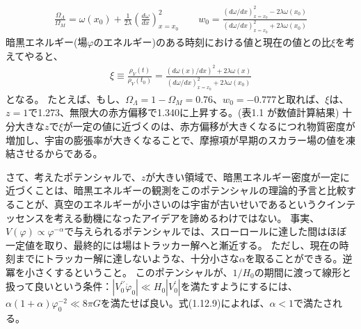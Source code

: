 \documentclass[11pt]{ltjsarticle}
\theoremstyle{plain}
\theoremstyle{break}
\begin{document}
\begin{align}
  \frac{\Omega_{\Lambda}}{\Omega_{M}}=\omega\left(x_{0}\right)+\frac{1}{2 \lambda}\left(\frac{d \omega}{d x}\right)_{x=x_{0}}^{2} \qquad w_{0}=\frac{(d \omega / d x)_{x=x_{0}}^{2}-2 \lambda \omega\left(x_{0}\right)}{(d \omega / d x)_{x=x_{0}}^{2}+2 \lambda \omega\left(x_{0}\right)}
\end{align}%
暗黒エネルギー(場$\varphi$のエネルギー)のある時刻における値と現在の値との比$\xi$を考えてやると、
\begin{align}
  \xi \equiv \frac{\rho_{V}(t)}{\rho_{V}\left(t_{0}\right)}=\frac{(d \omega(x) / d x)^{2}+2 \lambda \omega(x)}{(d \omega / d x)_{x=x_{0}}^{2}+2 \lambda \omega\left(x_{0}\right)}
\end{align}%
となる。
たとえば、もし、$\Omega_{\Lambda}=1-\Omega_{M}=0.76 、 w_{0}=-0.777$と取れば、$\xi$は、$z=1$で1.273、無限大の赤方偏移で1.340に上昇する。(表1.1 が数値計算結果)
十分大きな$z$で$\xi$が一定の値に近づくのは、赤方偏移が大きくなるにつれ物質密度が増加し、宇宙の膨張率が大きくなることで、摩擦項が早期のスカラー場の値を凍結させるからである。

さて、考えたポテンシャルで、$z$が大きい領域で、暗黒エネルギー密度が一定に近づくことは、暗黒エネルギーの観測をこのポテンシャルの理論的予言と比較することが、真空のエネルギーが小さいのは宇宙が古いせいであるというクインテッセンスを考える動機になったアイデアを諦めるわけではない。
事実、$V(\varphi)  \propto \varphi^{-\alpha}$で与えられるポテンシャルでは、スローロールに達した間はほぼ一定値を取り、最終的には場はトラッカー解へと漸近する。
ただし、現在の時刻までにトラッカー解に達しないような、十分小さな$\alpha$を取ることができる。逆冪を小さくするということ。
このポテンシャルが、$1/H_0$の期間に渡って線形と扱って良いという条件：$\left|V_{0}^{\prime \prime} \dot{\varphi}_{0}\right| \ll H_{0}\left|V_{0}^{\prime}\right|$を満たすようにするには、$\alpha(1+\alpha) \varphi_{0}^{-2} \ll 8 \pi G$を満たせば良い。式(1.12.9)によれば、$\alpha <1$で満たされる。
\end{document}
